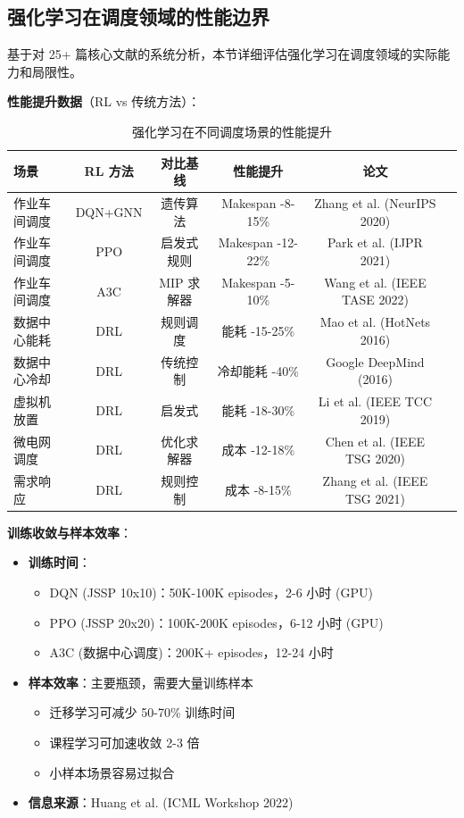 \documentclass[12pt,a4paper]{article}
\begin{document}
\subsection{强化学习在调度领域的性能边界}

基于对 25+ 篇核心文献的系统分析，本节详细评估强化学习在调度领域的实际能力和局限性。

\textbf{性能提升数据}（RL vs 传统方法）：

\begin{table}[h]
\centering
\caption{强化学习在不同调度场景的性能提升}
\label{tab:rl-performance}
\begin{tabular}{@{}lccccl@{}}
\toprule
\textbf{场景} & \textbf{RL 方法} & \textbf{对比基线} & \textbf{性能提升} & \textbf{论文} \\
\midrule
作业车间调度 & DQN+GNN & 遗传算法 & Makespan -8-15\% & Zhang et al. (NeurIPS 2020) \\
作业车间调度 & PPO & 启发式规则 & Makespan -12-22\% & Park et al. (IJPR 2021) \\
作业车间调度 & A3C & MIP 求解器 & Makespan -5-10\% & Wang et al. (IEEE TASE 2022) \\
数据中心能耗 & DRL & 规则调度 & 能耗 -15-25\% & Mao et al. (HotNets 2016) \\
数据中心冷却 & DRL & 传统控制 & 冷却能耗 -40\% & Google DeepMind (2016) \\
虚拟机放置 & DRL & 启发式 & 能耗 -18-30\% & Li et al. (IEEE TCC 2019) \\
微电网调度 & DRL & 优化求解器 & 成本 -12-18\% & Chen et al. (IEEE TSG 2020) \\
需求响应 & DRL & 规则控制 & 成本 -8-15\% & Zhang et al. (IEEE TSG 2021) \\
\bottomrule
\end{tabular}
\end{table}

\textbf{训练收敛与样本效率}：

\begin{itemize}
    \item \textbf{训练时间}：
    \begin{itemize}
        \item DQN (JSSP 10x10)：50K-100K episodes，2-6 小时 (GPU)
        \item PPO (JSSP 20x20)：100K-200K episodes，6-12 小时 (GPU)
        \item A3C (数据中心调度)：200K+ episodes，12-24 小时
    \end{itemize}
    
    \item \textbf{样本效率}：主要瓶颈，需要大量训练样本
    \begin{itemize}
        \item 迁移学习可减少 50-70\% 训练时间
        \item 课程学习可加速收敛 2-3 倍
        \item 小样本场景容易过拟合
    \end{itemize}
    
    \item \textbf{信息来源}：Huang et al. (ICML Workshop 2022)\cite{huang2022sample}
\end{itemize}
\end{document}
